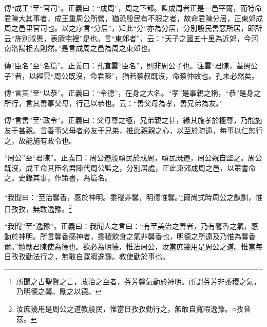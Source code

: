 {\noindent\zhuan{}\fzbyks 傳“成王”至“官司”。正義曰：“成周”，周之下都。監成周者正是一邑宰爾，而特命君陳大其事者，成王重周公所營，猶恐殷民有不服之者，故命君陳分居，正東郊成周之邑里官司也。以之序言“分居”，知此“分”亦為分居，分別殷民善惡所居，即所云“旌別淑慝，表厥宅裡”是也。言“東郊者”，云：“天子之國五十里為近郊，今河南洛陽相去則然。”是言成周之邑為周之東郊也。 \par}

{\noindent\zhuan{}\fzbyks 傳“臣名”至“名篇”。正義曰：孔直雲“臣名”，則非周公子也。注雲“君陳，蓋周公子”者，以經雲“周公既沒，命君陳”，猶若蔡叔既沒，命蔡仲故也。孔未必然矣。 \par}

{\noindent\zhuan{}\fzbyks 傳“言其”至“以恭”。正義曰：“令德”，在身之大名。“孝”是事親之稱，“恭”是身之所行，言其善事父母，行己以恭也。云：“善父母為孝，善兄弟為友。” \par}

{\noindent\zhuan{}\fzbyks 傳“言善”至“政令”。正義曰：父母尊之極，兄弟親之甚，緣其施孝於極尊，乃能施友于甚親。言善事父母者必友于兄弟，推此親親之心，以至於疏遠，每事以仁恕行之，故能施有政令也。 \par}

{\noindent\shu{}\fzkt “周公”至“君陳”。正義曰：周公遷殷頑民於成周，頑民既遷，周公親自監之。周公既沒，成王命其臣名君陳代周公監之，分別居處，正此東郊成周之邑，以策書命之。史錄其事，作策書，為篇名。 \par}

“我聞曰：‘至治馨香，感於神明。黍稷非馨，明德惟馨。’\footnote{所聞之古聖賢之言，政治之至者，芬芳馨氣動於神明。所謂芬芳非黍稷之氣，乃明德之馨。勵之以德。}爾尚式時周公之猷訓，惟日孜孜，無敢逸豫。\footnote{汝庶幾用是周公之道教殷民，惟當日孜孜勤行之，無敢自寬暇逸豫。○孜音茲。}

{\noindent\shu{}\fzkt “我聞”至“逸豫”。正義曰：我聞人之言曰：“有至美治之善者，乃有馨香之氣，感動於神明。所言馨香感神者，黍稷飲食之氣非馨香也，明德之所遠及乃惟為馨香爾。”勉勵君陳使為德也。欲必為明德，惟法周公，汝當庶幾用是周公之道。惟當每日孜孜勤法行之，無敢自寬暇逸豫。教使勤於事也。 \par}

